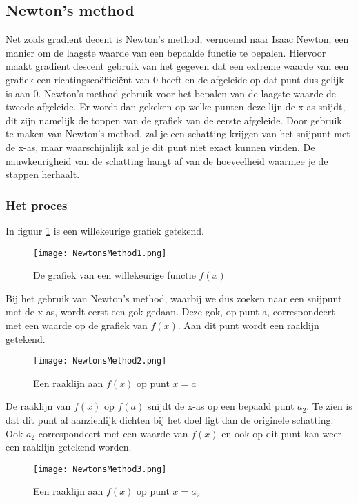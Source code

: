 \subsection{Newton's method}
Net zoals gradient decent is Newton’s method, vernoemd naar Isaac Newton, een manier om de laagste waarde van een bepaalde functie te bepalen. Hiervoor maakt gradient descent gebruik van het gegeven dat een extreme waarde van een grafiek een richtingsco\"effici\"ent van 0 heeft en de afgeleide op dat punt dus gelijk is aan 0. Newton’s method gebruik voor het bepalen van de laagste waarde de tweede afgeleide. Er wordt dan gekeken op welke punten deze lijn de x-as snijdt, dit zijn namelijk de toppen van de grafiek van de eerste afgeleide. Door gebruik te maken van Newton’s method, zal je een schatting krijgen van het snijpunt met de x-as, maar waarschijnlijk zal je dit punt niet exact kunnen vinden. De nauwkeurigheid van de schatting hangt af van de hoeveelheid waarmee je de stappen herhaalt.

\subsubsection{Het proces}
In figuur \ref{fig:NM1} is een willekeurige grafiek getekend.

\begin{figure}[H]
  \centering
    \texttt{[image: NewtonsMethod1.png]}
  \caption{De grafiek van een willekeurige functie $ f(x) $}
  \label{fig:NM1}
\end{figure}

Bij het gebruik van Newton’s method, waarbij we dus zoeken naar een snijpunt met de x-as, wordt eerst een gok gedaan. Deze gok, op punt a, correspondeert met een waarde op de grafiek van $ f(x) $. Aan dit punt wordt een raaklijn getekend.

\begin{figure}[h]
  \centering
    \texttt{[image: NewtonsMethod2.png]}
  \caption{Een raaklijn aan $ f(x) $ op punt $ x = a $}
  \label{fig:NM2}
\end{figure}

De raaklijn van $ f(x) $ op $ f(a) $ snijdt de x-as op een bepaald punt $ a_2 $. Te zien is dat dit punt al aanzienlijk dichten bij het doel ligt dan de originele schatting. Ook $ a_2 $ correspondeert met een waarde van $ f(x) $ en ook op dit punt kan weer een raaklijn getekend worden.

\begin{figure}[h]
  \centering
    \texttt{[image: NewtonsMethod3.png]}
  \caption{Een raaklijn aan $ f(x) $ op punt $ x = a_2 $}
  \label{fig:NM3}
\end{figure}

